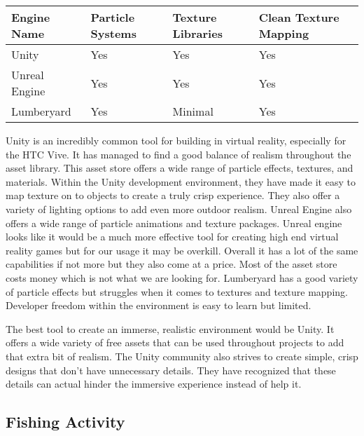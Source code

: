 \documentclass[10pt,journal,compsoc,onecolumn, draftclsnofoot]{IEEEtran}
\begin{document}
\vspace{2mm}
\begin{table}[h!]
\centering
  \begin{tabu} to 1.0\textwidth { | X[l] || X[c] | X[c] | X[c] |  }
  \hline
  Engine Name & Particle Systems & Texture Libraries & Clean Texture Mapping\\
  \hline
  Unity  & Yes & Yes & Yes\\
  Unreal Engine & Yes & Yes & Yes\\
  Lumberyard & Yes & Minimal & Yes \\
  \hline
  \end{tabu}
\end{table}
\vspace{2mm}

Unity is an incredibly common tool for building in virtual reality, especially for the HTC Vive.
It has managed to find a good balance of realism throughout the asset library\cite{unity_store_age}.
This asset store offers a wide range of particle effects, textures, and materials.
Within the Unity development environment, they have made it easy to map texture on to objects to create a truly crisp experience.
They also offer a variety of lighting options to add even more outdoor realism.
Unreal Engine also offers a wide range of particle animations and texture packages\cite{unreal_editor_manual}.
Unreal engine looks like it would be a much more effective tool for creating high end virtual reality games but for our usage it may be overkill.
Overall it has a lot of the same capabilities if not more but they also come at a price.
Most of the asset store costs money which is not what we are looking for.
Lumberyard has a good variety of particle effects but struggles when it comes to textures and texture mapping\cite{lumberyard_levels_environment}.
Developer freedom within the environment is easy to learn but limited.

The best tool to create an immerse, realistic environment would be Unity.
It offers a wide variety of free assets that can be used throughout projects to add that extra bit of realism.
The Unity community also strives to create simple, crisp designs that don’t have unnecessary details.
They have recognized that these details can actual hinder the immersive experience instead of help it.
\vspace{2mm
}

\subsection{Fishing Activity}
\end{document}
